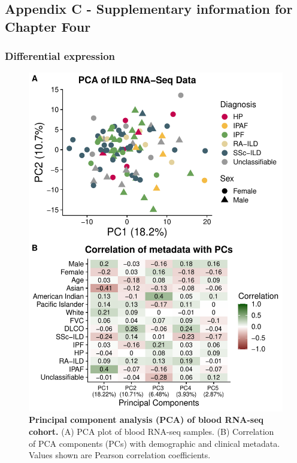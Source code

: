 \documentclass[
]{article}
\begin{document}
\begin{singlespace}
\end{singlespace}

\clearpage

\subsection{Appendix C - Supplementary information for Chapter Four}\label{appendix-c---supplementary-information-for-chapter-four}

\renewcommand{\thefigure}{A4.\arabic{figure}}
\setcounter{figure}{0}
\renewcommand{\thetable}{A4.\arabic{table}}
\setcounter{table}{0}
\renewcommand{\theequation}{A4.\arabic{equation}}
\setcounter{equation}{0}

\captionsetup{width=6.5in}

\subsubsection{Differential expression}\label{differential-expression-1}



\begin{figure}

{\centering \includegraphics[width=0.7\linewidth,]{./Figures/BloodRNAseq/bloodRNAseq_pca_v2} 

}

\caption[Correlation of PCs with metadata (blood RNA-seq)]{\textbf{Principal component analysis (PCA) of blood RNA-seq cohort.} (A) PCA plot of blood RNA-seq samples. (B) Correlation of PCA components (PCs) with demographic and clinical metadata. Values shown are Pearson correlation coefficients.}\label{fig:rnaseqPCA}
\end{figure}
\end{document}
